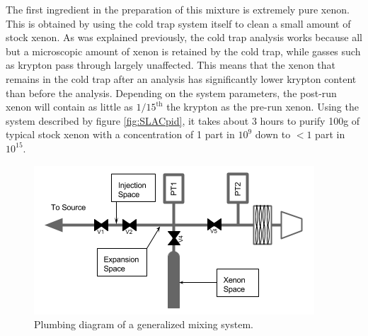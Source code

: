 The first ingredient in the preparation of this mixture is extremely pure xenon. This is obtained by using the cold trap system itself to clean a small amount of stock xenon. As was explained previously, the cold trap analysis works because all but a microscopic amount of xenon is retained by the cold trap, while gasses such as krypton pass through largely unaffected. This means that the xenon that remains in the cold trap after an analysis has significantly lower krypton content than before the analysis. Depending on the system parameters, the post-run xenon will contain as little as $1/15^{\textrm{th}}$ the krypton as the pre-run xenon. Using the system described by figure \ref{fig:SLACpid}, it takes about 3 hours to purify 100g of typical stock xenon with a concentration of 1 part in $10^{9}$ down to $< 1$ part in $10^{15}$.
\begin{figure}[h!]
  \includegraphics[width=\linewidth]{Figures/Mixing_diagram.png}
  \caption{Plumbing diagram of a generalized mixing system. }
  \label{fig:mixpid}
\end{figure}

